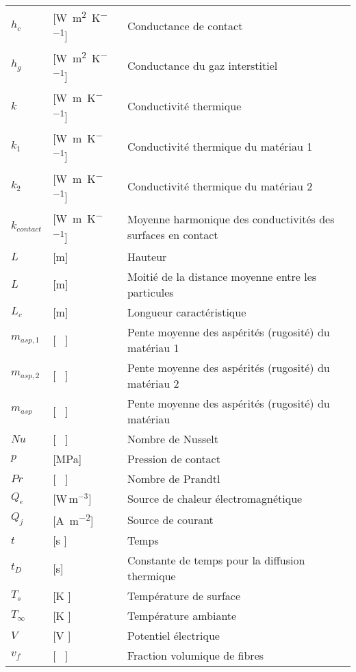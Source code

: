 \begin{longtable}{l p{3cm} p{5in}}
$h_c$ 				& [\si{\watt\per\square\metre\per\kelvin}] 	& Conductance de contact 							\\
$h_g$ 				& [\si{\watt\per\square\metre\per\kelvin}] 	& Conductance du gaz interstitiel 					\\
$k$ 				& [\si{\watt\per\metre\per\kelvin}] 	& Conductivité thermique 								\\
$k_1$ 				& [\si{\watt\per\metre\per\kelvin}] 	& Conductivité thermique du matériau 1 					\\
$k_2$ 				& [\si{\watt\per\metre\per\kelvin}] 	& Conductivité thermique du matériau 2 					\\
$k_{contact}$ 		& [\si{\watt\per\metre\per\kelvin}] 	& Moyenne harmonique des conductivités des surfaces en contact\\
$L$ 				& [\si{\metre}] 						& Hauteur 												\\
$L$					& [\si{\metre}]							& Moitié de la distance moyenne entre les particules 	\\
$L_c$ 				& [\si{\metre}] 						& Longueur caractéristique 								\\
$m_{asp,1}$ 		& [ \ ] 								& Pente moyenne des aspérités (rugosité) du matériau 1 	\\
$m_{asp,2}$ 		& [ \ ] 								& Pente moyenne des aspérités (rugosité) du matériau 2 	\\
$m_{asp}$ 			& [ \ ] 								& Pente moyenne des aspérités (rugosité) du matériau 	\\
$Nu$ 				& [ \ ] 								& Nombre de Nusselt 									\\
$p$ 				& [\si{\mega\pascal}] 					& Pression de contact 									\\
$Pr$ 				& [ \ ] 								& Nombre de Prandtl 									\\
$Q_e$ 				& [W\,m$^{-3}$] 						& Source de chaleur électromagnétique 					\\
$Q_j$ 				& [\si{\ampere\per\square\metre}] 		& Source de courant 									\\
$t$ 				& [\si{\second} ] 						& Temps 												\\
$t_D$				& [\si{\second}] 						& Constante de temps pour la diffusion thermique 		\\
$T_s$ 				& [\si{\kelvin} ] 						& Température de surface 								\\
$T_{\infty}$ 		& [\si{\kelvin} ] 						& Température ambiante 									\\
$V$ 				& [\si{\volt} ] 						& Potentiel électrique 									\\
$v_f$ 				& [ \ ] 								& Fraction volumique de fibres
\end{longtable}
